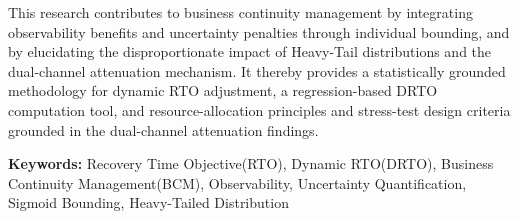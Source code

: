{This research contributes to business continuity management by integrating observability benefits and uncertainty penalties through individual bounding, and by elucidating the disproportionate impact of Heavy-Tail distributions and the dual-channel attenuation mechanism. It thereby provides a statistically grounded methodology for dynamic RTO adjustment, a regression-based DRTO computation tool, and resource-allocation principles and stress-test design criteria grounded in the dual-channel attenuation findings. 

\vspace{10mm}
\noindent\textbf{Keywords:} Recovery Time Objective(RTO), Dynamic RTO(DRTO), Business Continuity Management(BCM), Observability, Uncertainty Quantification, Sigmoid Bounding, Heavy-Tailed Distribution

}
